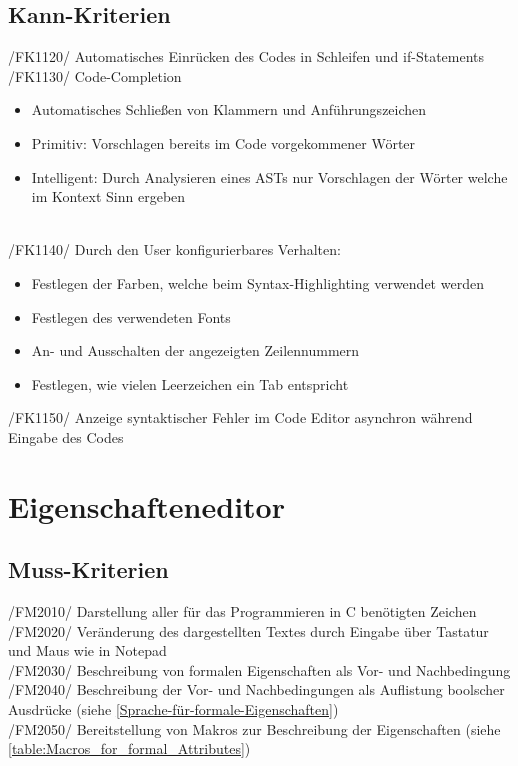 \documentclass[a4paper]{scrreprt}
\begin{document}
\subsection{Kann-Kriterien}
/FK1120/ Automatisches Einrücken des Codes in Schleifen und if-Statements \\
/FK1130/ Code-Completion
\begin{itemize}
\item Automatisches Schließen von Klammern und Anführungszeichen
\item Primitiv: Vorschlagen bereits im Code vorgekommener Wörter
\item Intelligent: Durch Analysieren eines ASTs nur Vorschlagen der Wörter welche im Kontext Sinn ergeben
\end{itemize}
\\
/FK1140/ Durch den User konfigurierbares Verhalten:
\begin{itemize}
\item Festlegen der Farben, welche beim Syntax-Highlighting verwendet werden
\item Festlegen des verwendeten Fonts
\item An- und Ausschalten der angezeigten Zeilennummern
\item Festlegen, wie vielen Leerzeichen ein Tab entspricht
\end{itemize}
/FK1150/ Anzeige syntaktischer Fehler im Code Editor asynchron während Eingabe des Codes
 
\section{Eigenschafteneditor}
\subsection{Muss-Kriterien}
/FM2010/ Darstellung aller für das Programmieren in C benötigten Zeichen \\
/FM2020/ Veränderung des dargestellten Textes durch Eingabe über Tastatur und Maus wie in Notepad \\
/FM2030/ Beschreibung von formalen Eigenschaften als Vor- und Nachbedingung  \\
/FM2040/ Beschreibung der Vor- und Nachbedingungen als Auflistung boolscher Ausdrücke (siehe \ref{Sprache-für-formale-Eigenschaften})\\
/FM2050/ Bereitstellung von Makros zur Beschreibung der Eigenschaften (siehe \ref{table:Macros_for_formal_Attributes}) \\
\end{document}
